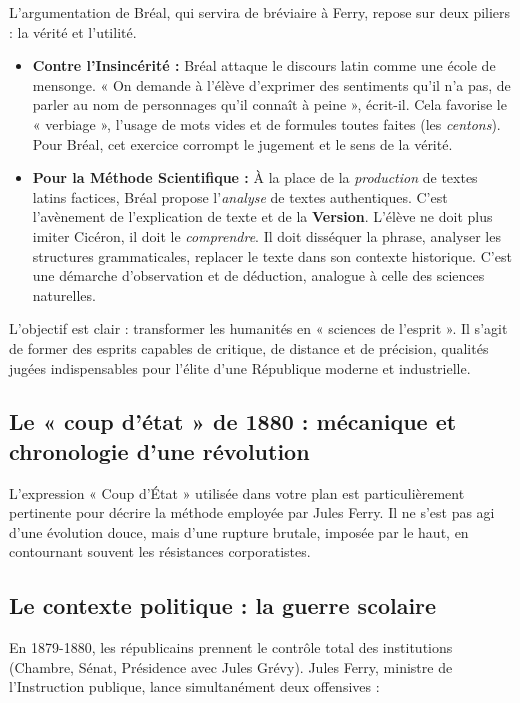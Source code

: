 L'argumentation de Bréal, qui servira de bréviaire à Ferry, repose sur deux piliers : la vérité et
l'utilité.

\begin{itemize}\item \textbf{Contre l'Insincérité :} Bréal attaque le discours latin comme une école de mensonge. « On demande à l'élève d'exprimer des sentiments qu'il n'a pas, de parler au nom de personnages qu'il connaît à peine », écrit-il. Cela favorise le « verbiage », l'usage de mots vides et de formules toutes faites (les \textit{centons}). Pour Bréal, cet exercice corrompt le jugement et le sens de la vérité.\cite{I-1-2-ref19}\item \textbf{Pour la Méthode Scientifique :} À la place de la \textit{production} de textes latins factices, Bréal propose l'\textit{analyse} de textes authentiques. C'est l'avènement de l'explication de texte et de la \textbf{Version}. L'élève ne doit plus imiter Cicéron, il doit le \textit{comprendre}. Il doit disséquer la phrase, analyser les structures grammaticales, replacer le texte dans son contexte historique. C'est une démarche d'observation et de déduction, analogue à celle des sciences naturelles.\cite{I-1-2-ref21}\end{itemize}L'objectif est clair : transformer les humanités en « sciences de l'esprit ». Il s'agit de former
des esprits capables de critique, de distance et de précision, qualités jugées indispensables pour
l'élite d'une République moderne et industrielle.\cite{I-1-2-ref23}



\subsection{Le « coup d'état » de 1880 : mécanique et chronologie d'une révolution}

L'expression « Coup d'État » utilisée dans votre plan est particulièrement pertinente pour décrire
la méthode employée par Jules Ferry. Il ne s'est pas agi d'une évolution douce, mais d'une rupture
brutale, imposée par le haut, en contournant souvent les résistances corporatistes.



\subsection{Le contexte politique : la guerre scolaire}

En 1879-1880, les républicains prennent le contrôle total des institutions (Chambre, Sénat,
Présidence avec Jules Grévy). Jules Ferry, ministre de l'Instruction publique, lance simultanément
deux offensives :

